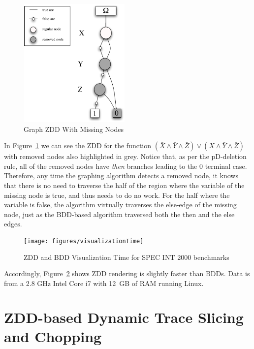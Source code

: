 \documentclass[defaultstyle,11pt]{thesis}
\begin{document}
\begin{figure}
\begin{center}
\includegraphics[height=2.5in]{figures/zddgraphEx1}
\end{center}
\caption{Graph ZDD With Missing Nodes}
\label{fig:zddGraph}
\end{figure}

In Figure~\ref{fig:zddGraph} we can see the ZDD for the function
$(\bar{X}\land\bar{Y}\land\bar{Z})\lor(X\land\bar{Y}\land\bar{Z})$
with removed nodes also highlighted in grey.  Notice that, as per the
pD-deletion rule, all of the removed nodes have \textit{then} branches
leading to the $0$ terminal case. Therefore, any time the graphing
algorithm detects a removed node, it knows that there is no need to
traverse the half of the region where the variable of the missing node
is true, and thus needs to do no work.  For the half where the
variable is false, the algorithm virtually traverses the else-edge of
the missing node, just as the BDD-based algorithm traversed both the
then and the else edges.
\begin{figure}
 \begin{center}
  \texttt{[image: figures/visualizationTime]}  
 \end{center}
 \caption{ZDD and BDD Visualization Time for SPEC INT 2000 benchmarks}
 \label{fig:visualTime}
\end{figure}
Accordingly, Figure~\ref{fig:visualTime} shows ZDD rendering is
slightly faster than BDDs.  Data is from a 2.8 GHz Intel
Core i7 with 12~GB of RAM running Linux.
\chapter{ZDD-based Dynamic Trace Slicing and Chopping}
\label{chap:zddchop}
\end{document}
